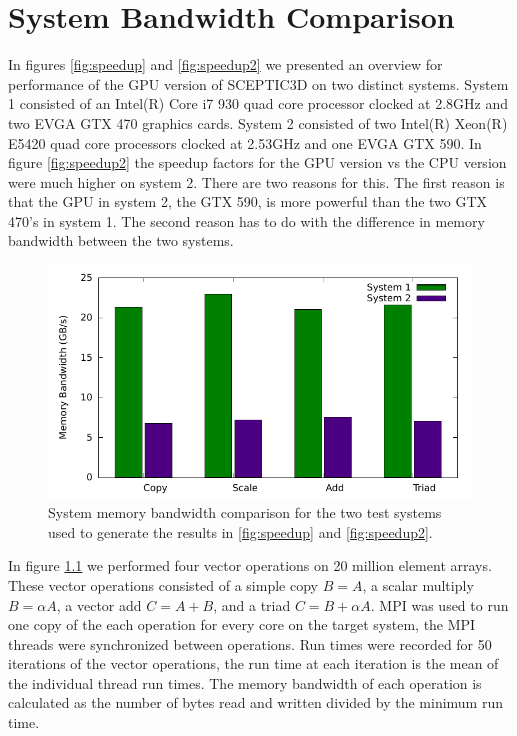 \chapter{System Bandwidth Comparison}


In figures \ref{fig:speedup} and \ref{fig:speedup2} we presented an overview for performance of the GPU version of SCEPTIC3D on two distinct systems. System 1 consisted of an Intel(R) Core i7 930 quad core processor clocked at 2.8GHz and two EVGA GTX 470 graphics cards. System 2 consisted of two Intel(R) Xeon(R) E5420 quad core processors clocked at 2.53GHz and one EVGA GTX 590. In figure \ref{fig:speedup2} the speedup factors for the GPU version vs the CPU version were much higher on system 2. There are two reasons for this. The first reason is that the GPU in system 2, the GTX 590, is more powerful than the two GTX 470's in system 1. The second reason has to do with the difference in memory bandwidth between the two systems.

\noindent \begin{figure}
\begin{center}
\includegraphics[width=6in]{appb/bandwidth_test.pdf}
\end{center}
\caption[System Memory Bandwidth Comparison]{System memory bandwidth comparison for the two test systems used to generate the results in \ref{fig:speedup} and \ref{fig:speedup2}.}
\label{fig:memory_bandwidth_compare} 
\end{figure} 

In figure \ref{fig:memory_bandwidth_compare} we performed four vector operations on 20 million element arrays. These vector operations consisted of a simple copy $B = A$, a scalar multiply $B = \alpha A$, a vector add $C = A+B$, and a triad $C = B+\alpha A$. MPI was used to run one copy of the each operation for every core on the target system, the MPI threads were synchronized between operations. Run times were recorded for 50 iterations of the vector operations, the run time at each iteration is the mean of the individual thread run times. The memory bandwidth of each operation is calculated as the number of bytes read and written divided by the minimum run time.    



\clearpage
\newpage
